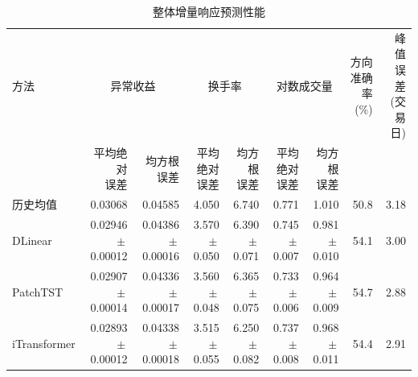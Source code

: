 \begin{table}[!htbp]
\centering
\caption{整体增量响应预测性能}\label{tab:overall}
\fontsize{8.6}{10.6}\selectfont
\setlength{\tabcolsep}{3pt}
\renewcommand{\arraystretch}{1.08}
\begin{tabular*}{\linewidth}{@{\extracolsep{\fill}}lrrrrrrrr@{}}
\toprule
方法 & \multicolumn{2}{c}{异常收益} & \multicolumn{2}{c}{换手率} & \multicolumn{2}{c}{对数成交量} & \shortstack{方向准确率\\(\%)} & \shortstack{峰值误差\\(交易日)} \\
\cmidrule(lr){2-3}\cmidrule(lr){4-5}\cmidrule(lr){6-7}
 & \shortstack{平均绝对\\误差} & \shortstack{均方根\\误差} & \shortstack{平均绝对\\误差} & \shortstack{均方根\\误差} & \shortstack{平均绝对\\误差} & \shortstack{均方根\\误差} &  &  \\
\midrule
历史均值 & 0.03068 & 0.04585 & 4.050 & 6.740 & 0.771 & 1.010 & 50.8 & 3.18 \\
DLinear & \shortstack[r]{0.02946\\{\scriptsize $\pm$\,0.00012}} & \shortstack[r]{0.04386\\{\scriptsize $\pm$\,0.00016}} & \shortstack[r]{3.570\\{\scriptsize $\pm$\,0.050}} & \shortstack[r]{6.390\\{\scriptsize $\pm$\,0.071}} & \shortstack[r]{0.745\\{\scriptsize $\pm$\,0.007}} & \shortstack[r]{0.981\\{\scriptsize $\pm$\,0.010}} & 54.1 & 3.00 \\[2pt]
PatchTST & \shortstack[r]{0.02907\\{\scriptsize $\pm$\,0.00014}} & \shortstack[r]{0.04336\\{\scriptsize $\pm$\,0.00017}} & \shortstack[r]{3.560\\{\scriptsize $\pm$\,0.048}} & \shortstack[r]{6.365\\{\scriptsize $\pm$\,0.075}} & \shortstack[r]{0.733\\{\scriptsize $\pm$\,0.006}} & \shortstack[r]{0.964\\{\scriptsize $\pm$\,0.009}} & 54.7 & 2.88 \\[2pt]
iTransformer & \shortstack[r]{0.02893\\{\scriptsize $\pm$\,0.00012}} & \shortstack[r]{0.04338\\{\scriptsize $\pm$\,0.00018}} & \shortstack[r]{3.515\\{\scriptsize $\pm$\,0.055}} & \shortstack[r]{6.250\\{\scriptsize $\pm$\,0.082}} & \shortstack[r]{0.737\\{\scriptsize $\pm$\,0.008}} & \shortstack[r]{0.968\\{\scriptsize $\pm$\,0.011}} & 54.4 & 2.91 \\[2pt]

\end{tabular*}
\end{table}

